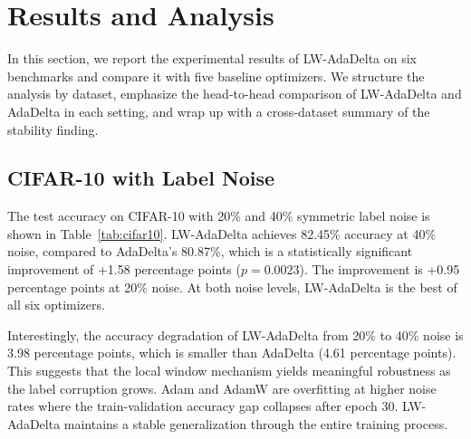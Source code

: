\documentclass[11pt,a4paper]{article}
\begin{document}
\section{Results and Analysis}
\label{sec:results}

In this section, we report the experimental results of LW-AdaDelta on six benchmarks and compare it with five baseline optimizers. We structure the analysis by dataset, emphasize the head-to-head comparison of LW-AdaDelta and AdaDelta in each setting, and wrap up with a cross-dataset summary of the stability finding.

\subsection{CIFAR-10 with Label Noise}

The test accuracy on CIFAR-10 with 20\% and 40\% symmetric label noise is shown in Table~\ref{tab:cifar10}. LW-AdaDelta achieves 82.45\% accuracy at 40\% noise, compared to AdaDelta's 80.87\%, which is a statistically significant improvement of +1.58 percentage points ($p=0.0023$). The improvement is +0.95 percentage points at 20\% noise. At both noise levels, LW-AdaDelta is the best of all six optimizers.

Interestingly, the accuracy degradation of LW-AdaDelta from 20\% to 40\% noise is 3.98 percentage points, which is smaller than AdaDelta (4.61 percentage points). This suggests that the local window mechanism yields meaningful robustness as the label corruption grows. Adam and AdamW are overfitting at higher noise rates where the train-validation accuracy gap collapses after epoch 30. LW-AdaDelta maintains a stable generalization through the entire training process.
\end{document}
